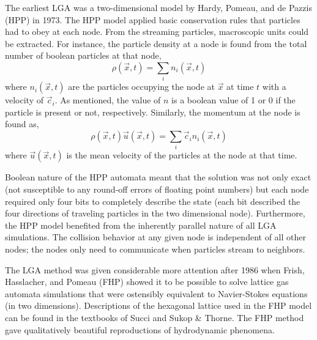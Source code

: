 The earliest LGA was a two-dimensional model by Hardy, Pomeau, and de Pazzis (HPP) in 1973.\cite{Hardy1975} The HPP model applied basic conservation rules that particles had to obey at each node. From the streaming particles, macroscopic units could be extracted. For instance, the particle density at a node is found from the total number of boolean particles at that node,
\begin{equation}
	\rho(\vec{x},t) = \sum_i n_i(\vec{x},t)
\end{equation}
where $n_i(\vec{x},t)$ are the particles occupying the node at $\vec{x}$ at time $t$ with a velocity of $\vec{c}_i$. As mentioned, the value of $n$ is a boolean value of 1 or 0 if the particle is present or not, respectively. Similarly, the momentum at the node is found as,
\begin{equation}
	\rho(\vec{x},t)\vec{u}(\vec{x},t) = \sum_i \vec{c}_in_i(\vec{x},t)
\end{equation}
where $\vec{u}(\vec{x},t)$ is the mean velocity of the particles at the node at that time.

Boolean nature of the HPP automata meant that the solution was not only exact (not susceptible to any round-off errors of floating point numbers) but each node required only four bits to completely describe the state (each bit described the four directions of traveling particles in the two dimensional node).\cite{Hardy1975} Furthermore, the HPP model benefited from the inherently parallel nature of all LGA simulations. The collision behavior at any given node is independent of all other nodes; the nodes only need to communicate when particles stream to neighbors.\cite{succi2001lattice}

The LGA method was given considerable more attention after 1986 when Frish, Hasslacher, and Pomeau (FHP) showed it to be possible to solve lattice gas automata simulations that were ostensibly equivalent to Navier-Stokes equations (in two dimensions).\cite{Frisch1986} Descriptions of the hexagonal lattice used in the FHP model can be found in the textbooks of Succi\cite{succi2001lattice} and Sukop \& Thorne\cite{Sukop2007}. The FHP method gave qualitatively beautiful reproductions of hydrodynamic phenomena.

